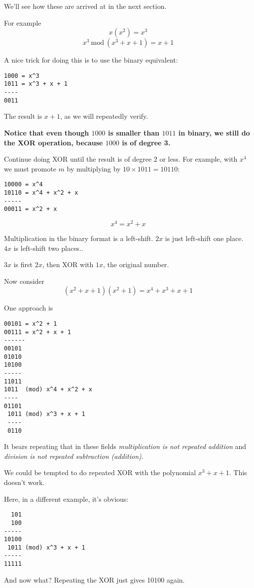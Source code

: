 \documentclass[11pt, oneside]{article}
\begin{document}
We'll see how these are arrived at in the next section.  

For example
\[ x (x^2) = x^3 \]
\[ x^3 \ \text{mod}\  (x^3 + x + 1) = x + 1 \]

A nice trick for doing this is to use the binary equivalent:
\begin{verbatim}
1000 = x^3
1011 = x^3 + x + 1
----
0011
\end{verbatim}

The result is $x + 1$, as we will repeatedly verify. 

\textbf{Notice that even though $1000$ is smaller than $1011$ in binary, we still do the XOR operation, because $1000$ is of degree 3.}

Continue doing XOR until the result is of degree 2 or less.  For example, with $x^4$ we must promote $m$ by multiplying by $10 \times 1011 = 10110$:

\begin{verbatim}
10000 = x^4
10110 = x^4 + x^2 + x
-----
00011 = x^2 + x
\end{verbatim}

\[ x^4 = x^2 + x \]

Multiplication in the binary format is a left-shift.  $2x$ is just left-shift one place.   $4x$ is left-shift two places..  

$3x$ is first $2x$, then XOR with $1x$, the original number.

Now consider 
\[ (x^2 + x + 1)(x^2 + 1) = x^4 + x^3 + x + 1 \]

One approach is

\begin{verbatim}
00101 = x^2 + 1
00111 = x^2 + x + 1
------
00101
01010
10100
-----
11011
1011  (mod) x^4 + x^2 + x 
----
01101
 1011 (mod) x^3 + x + 1
 ----
 0110
 \end{verbatim}
 
 It bears repeating that in these fields \emph{multiplication is not repeated addition} and \emph{division is not repeated subtraction (addition)}.
 
We could be tempted to do repeated XOR with the polynomial $x^3 + x + 1$.  This doesn't work.  

Here, in a different example, it's obvious:

\begin{verbatim}
  101
  100
-----
10100
 1011 (mod) x^3 + x + 1
-----
11111
\end{verbatim}

And now what?  Repeating the XOR just gives 10100 again.
\end{document}
